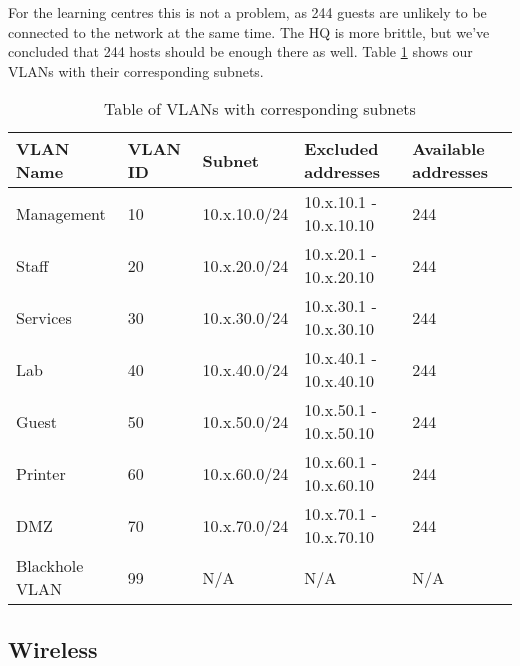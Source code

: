 For the learning centres this is not a problem, as 244 guests are unlikely to be connected to the network at the same time. The HQ is more brittle, but we've concluded that 244 hosts should be enough there as well. Table \ref{VLANsubnettable} shows our VLANs with their corresponding subnets.


\begin{table}[H]
\caption{Table of VLANs with corresponding subnets}
\label{VLANsubnettable}
\begin{tabular}{|l|l|l|l|l|}
\hline
\textbf{VLAN Name} & \textbf{VLAN ID} & \textbf{Subnet} & \textbf{Excluded addresses} & \textbf{Available addresses} \\ \hline

Management     & 10      & 10.x.10.0/24 & 10.x.10.1 - 10.x.10.10 & 244 \\ \hline
Staff          & 20      & 10.x.20.0/24 & 10.x.20.1 - 10.x.20.10 & 244 \\ \hline
Services       & 30      & 10.x.30.0/24 & 10.x.30.1 - 10.x.30.10 & 244 \\ \hline
Lab            & 40      & 10.x.40.0/24 & 10.x.40.1 - 10.x.40.10 & 244 \\ \hline
Guest          & 50      & 10.x.50.0/24 & 10.x.50.1 - 10.x.50.10 & 244 \\ \hline
Printer        & 60      & 10.x.60.0/24 & 10.x.60.1 - 10.x.60.10 & 244 \\ \hline
DMZ            & 70      & 10.x.70.0/24 & 10.x.70.1 - 10.x.70.10 & 244 \\ \hline
Blackhole VLAN & 99      & N/A          & N/A                    & N/A \\ \hline
\end{tabular}
\end{table}

\subsection{Wireless}


